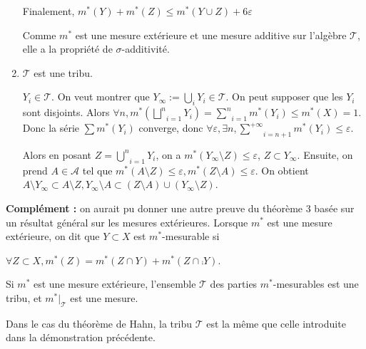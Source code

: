 \documentclass[10pt,a4paper,notitlepage ]{report}
\begin{document}
\begin{demo}
\begin{enumerate}
\begin{demo}
			Finalement, $m^*(Y) + m^*(Z) \le m^*(Y \cup Z) + 6\varepsilon$ 
		\end{demo}
	Comme $m^*$ est une mesure extérieure et une mesure additive sur l'algèbre $\mathcal T$, elle a la propriété de $\sigma$-additivité.
	\item $\mathcal T$ est une tribu.
	\begin{demo}
		$Y_i \in \mathcal T$. On veut montrer que $Y_\infty := \underset i \bigcup Y_i \in \mathcal T$. On peut supposer que les $Y_i$ sont disjoints. Alors $\forall n, m^*(\underset{i = 1}{\overset{n} \bigsqcup} Y_i) = \underset{i = 1}{\overset{n} \sum} m^*(Y_i) \le m^*(X) = 1$. Donc la série $\sum m^*(Y_i)$ converge, donc $\forall \varepsilon, \exists n, \underset{i = n+1}{\overset{+\infty} \sum} m^*(Y_i) \le \varepsilon$.
					
		Alors en posant $Z= \underset{i = 1}{\overset{n} \bigcup} Y_i$, on a $m^*(Y_\infty \setminus Z) \le \varepsilon$, $Z \subset Y_\infty$. Ensuite, on prend $A \in \mathcal A$ tel que $m^*(A\setminus Z) \le \varepsilon, m^*(Z\setminus A) \le \varepsilon$. On obtient $A \setminus Y_\infty \subset A \setminus Z, Y_\infty \setminus A \subset (Z \setminus A) \cup (Y_\infty \setminus Z)$.
	\end{demo}
	\end{enumerate}
\end{demo}

\textbf{Complément :} on aurait pu donner une autre preuve du théorème 3 basée sur un résultat général sur les mesures extérieures. Lorsque $m^*$ est une mesure extérieure, on dit que $Y \subset X$ est $m^*$-mesurable si

$\forall Z \subset X, m^*(Z) = m^*(Z \cap Y) + m^*(Z \cap \comp Y)$.

\begin{theorem}[Carathéodory]
	Si $m^*$ est une mesure extérieure, l'ensemble $\mathcal T$ des parties $m^*$-mesurables est une tribu, et $m^*|_{\mathcal T}$ est une mesure.
\end{theorem}
\begin{rem}
	Dans le cas du théorème de Hahn, la tribu $\mathcal T$ est la même que celle introduite dans la démonstration précédente.
\end{rem}
\end{document}
